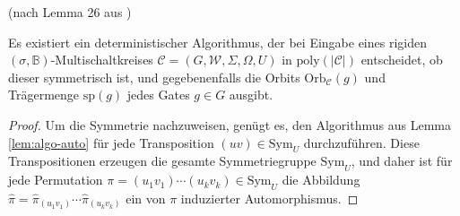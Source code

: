 \begin{lem}
\label{lem:algo-orb}(nach Lemma 26 aus \cite{AD2014})

Es existiert ein deterministischer Algorithmus, der bei Eingabe eines
rigiden $\left(\sigma,\mathbb{B}\right)$-Multischaltkreises $\mathcal{C}=\left(G,\mathcal{W},\Sigma,\Omega,U\right)$
in $\mathrm{poly}\left(\left|\mathcal{C}\right|\right)$ entscheidet,
ob dieser symmetrisch ist, und gegebenenfalls die Orbits $\mathrm{Orb}_{\mathcal{C}}\left(g\right)$
und Trägermenge $\mathrm{sp}\left(g\right)$ jedes Gates $g\in G$
ausgibt.
\end{lem}
\begin{proof}
Um die Symmetrie nachzuweisen, genügt es, den Algorithmus aus Lemma
\ref{lem:algo-auto} für jede Transposition $\left(uv\right)\in\mathrm{Sym}_{U}$
durchzuführen. Diese Transpositionen erzeugen die gesamte Symmetriegruppe
$\mathrm{Sym}_{U}$, und daher ist für jede Permutation $\pi=\left(u_{1}v_{1}\right)\cdots\left(u_{k}v_{k}\right)\in\mathrm{Sym}_{U}$
die Abbildung $\hat{\pi}=\hat{\pi}_{\left(u_{1}v_{1}\right)}\cdots\hat{\pi}_{\left(u_{k}v_{k}\right)}$
ein von $\pi$ induzierter Automorphismus.


\end{proof}
